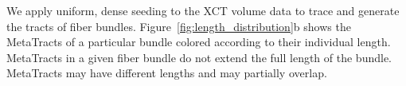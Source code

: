 We apply uniform, dense seeding to the XCT volume data to trace and generate the tracts of fiber bundles. Figure~\ref{fig:length_distribution}b shows the MetaTracts of a particular bundle colored according to their individual length.
%
MetaTracts in a given fiber bundle do not extend the full length of the bundle. MetaTracts may have different lengths and may partially overlap.
 
 
%
 


